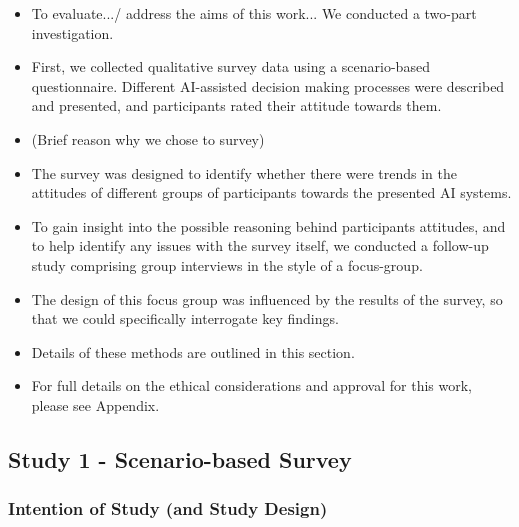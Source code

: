 \documentclass[manuscript,screen,review]{acmart}
\begin{document}
\begin{itemize}
\item To evaluate.../ address the aims of this work... We conducted a two-part investigation.
\item First, we collected qualitative survey data using a scenario-based questionnaire. Different AI-assisted decision making processes were described and presented, and participants rated their attitude towards them.
\item (Brief reason why we chose to survey)
\end{itemize}
\begin{itemize}
\item The survey was designed to identify whether there were trends in the attitudes of different groups of participants towards the presented AI systems. 
\item To gain insight into the possible reasoning behind participants attitudes, and to help identify any issues with the survey itself, we conducted a follow-up study comprising group interviews in the style of a focus-group.
\item The design of this focus group was influenced by the results of the survey, so that we could specifically interrogate key findings. 
\item Details of these methods are outlined in this section. 
\item For full details on the ethical considerations and approval for this work, please see Appendix.
\end{itemize}


\subsection{Study 1 - Scenario-based Survey }
\subsubsection{Intention of Study (and Study Design)} 
\label{study1_intentions}

\end{document}
